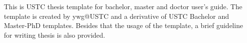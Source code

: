 \begin{enabstract}
This is USTC thesis template for bachelor, master and doctor user's guide.
The template is created by ywg@USTC and a derivative of USTC Bachelor and
Master-PhD templates. Besides that the usage of the template, a brief guideline
for writing thesis is also provided.

\end{enabstract}
